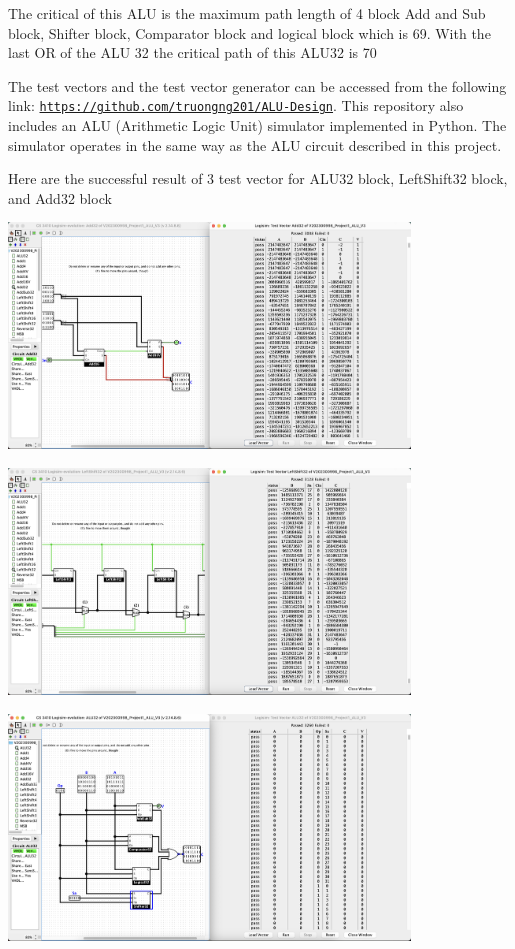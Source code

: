 \documentclass{article}
\begin{document}
\hspace{2em}The critical of this ALU is the maximum path length of 4 block Add and Sub block, Shifter block, Comparator block and logical block which is 69. With the last OR of the ALU 32 the critical path of this ALU32 is 70

\hspace{2em}The test vectors and the test vector generator can be accessed from the following link:  
\texttt{\href{https://github.com/truongng201/ALU-Design}{https://github.com/truongng201/ALU-Design}}. This repository also includes an ALU (Arithmetic Logic Unit) simulator implemented in Python. The simulator operates in the same way as the ALU circuit described in this project.

\hspace{2em} Here are the successful result of 3 test vector for ALU32 block, LeftShift32 block, and Add32 block
\begin{center}
    \includegraphics[width=0.8\textwidth]{images/Add_test_vector.png}
\end{center}
\begin{center}
    \includegraphics[width=0.8\textwidth]{images/Leftshift_test_vector.png}
\end{center}
\begin{center}
    \includegraphics[width=0.8\textwidth]{images/ALU_test_vector.png}
\end{center}
\end{document}
